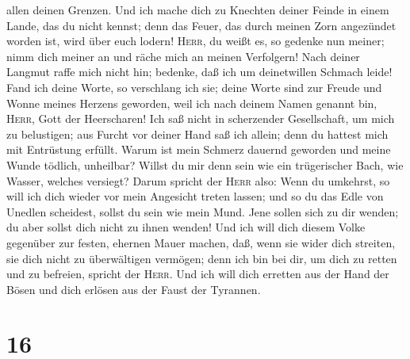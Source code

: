 allen deinen Grenzen.  Und ich mache dich zu Knechten
deiner Feinde in einem Lande, das du nicht kennst; denn das Feuer, das
durch meinen Zorn angezündet worden ist, wird über euch lodern!
 \textsc{Herr}, du weißt es, so gedenke nun meiner; nimm
dich meiner an und räche mich an meinen Verfolgern! Nach deiner Langmut
raffe mich nicht hin; bedenke, daß ich um deinetwillen Schmach leide!
 Fand ich deine Worte, so verschlang ich sie; deine Worte
sind zur Freude und Wonne meines Herzens geworden, weil ich nach deinem
Namen genannt bin, \textsc{Herr}, Gott der Heerscharen! 
Ich saß nicht in scherzender Gesellschaft, um mich zu belustigen; aus
Furcht vor deiner Hand saß ich allein; denn du hattest mich mit
Entrüstung erfüllt.  Warum ist mein Schmerz dauernd
geworden und meine Wunde tödlich, unheilbar? Willst du mir denn sein wie
ein trügerischer Bach, wie Wasser, welches versiegt? 
Darum spricht der \textsc{Herr} also: Wenn du umkehrst, so will ich dich
wieder vor mein Angesicht treten lassen; und so du das Edle von Unedlen
scheidest, sollst du sein wie mein Mund. Jene sollen sich zu dir wenden;
du aber sollst dich nicht zu ihnen wenden!  Und ich will
dich diesem Volke gegenüber zur festen, ehernen Mauer machen, daß, wenn
sie wider dich streiten, sie dich nicht zu überwältigen vermögen; denn
ich bin bei dir, um dich zu retten und zu befreien, spricht der
\textsc{Herr}.  Und ich will dich erretten aus der Hand
der Bösen und dich erlösen aus der Faust der Tyrannen.

\hypertarget{section-15}{%
\section{16}\label{section-15}}

